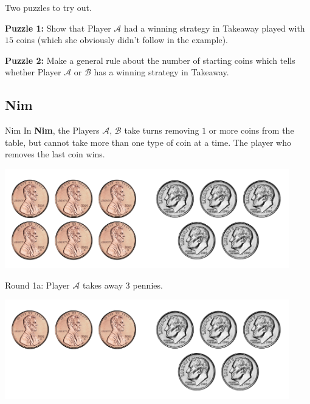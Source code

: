 \documentclass{beamer}
\theoremstyle{theorem}
\theoremstyle{definition}
\newcommand{\<}{\langle}
\renewcommand{\>}{\rangle}
\newcommand{\pl}[1]{\mathscr{#1}}
\newcommand{\vpause}{\pause\vspace{1em}}
\newcommand{\term}[1]{\textbf{#1}}
\begin{document}
\begin{frame}
  Two puzzles to try out.

  \vpause

  \textbf{Puzzle 1:} Show that Player $\pl A$ had a winning strategy
  in Takeaway played with $15$ coins (which she obviously didn't follow
  in the example).

  \vpause

  \textbf{Puzzle 2:} Make a general rule about the number of starting coins
  which tells whether Player $\pl A$ or $\pl B$ has a winning strategy in
  Takeaway.
\end{frame}

\subsection{Nim}

\begin{frame}{Nim}
  In \term{Nim}, the Players $\pl A$, $\pl B$ take turns removing $1$ or more
  coins from the table, but cannot take more than one type of coin at a
  time. The player who removes the last coin wins.

  \vspace{1em}

  \centerline{
    \includegraphics[height=1.7in]{nimCoins/65.pdf}
  }
\end{frame}

\begin{frame}
  Round 1a: Player $\pl A$ takes away 3 pennies.

  \centerline{
    \includegraphics[height=1.7in]{nimCoins/35.pdf}
  }
\end{frame}
\end{document}
